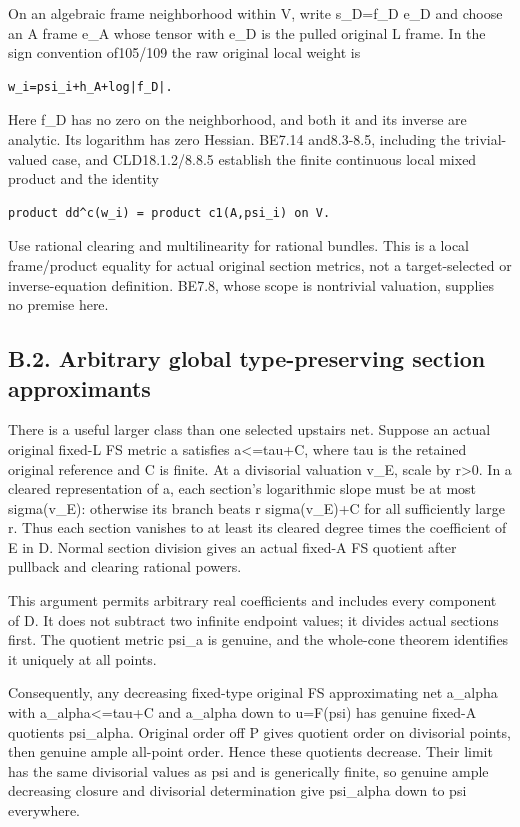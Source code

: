 \documentclass[
  10pt,
]{article}
\begin{document}
On an algebraic frame neighborhood within V, write s\_D=f\_D e\_D and
choose an A frame e\_A whose tensor with e\_D is the pulled original L
frame. In the sign convention of105/109 the raw original local weight is

\begin{verbatim}
w_i=psi_i+h_A+log|f_D|.
\end{verbatim}

Here f\_D has no zero on the neighborhood, and both it and its inverse
are analytic. Its logarithm has zero Hessian. BE7.14 and8.3-8.5,
including the trivial-valued case, and CLD18.1.2/8.8.5 establish the
finite continuous local mixed product and the identity

\begin{verbatim}
product dd^c(w_i) = product c1(A,psi_i) on V.
\end{verbatim}

Use rational clearing and multilinearity for rational bundles. This is a
local frame/product equality for actual original section metrics, not a
target-selected or inverse-equation definition. BE7.8, whose scope is
nontrivial valuation, supplies no premise here.

\subsection{B.2. Arbitrary global type-preserving section
approximants}\label{b.2.-arbitrary-global-type-preserving-section-approximants}

There is a useful larger class than one selected upstairs net. Suppose
an actual original fixed-L FS metric a satisfies a\textless=tau+C, where
tau is the retained original reference and C is finite. At a divisorial
valuation v\_E, scale by r\textgreater0. In a cleared representation of
a, each section's logarithmic slope must be at most sigma(v\_E):
otherwise its branch beats r sigma(v\_E)+C for all sufficiently large r.
Thus each section vanishes to at least its cleared degree times the
coefficient of E in D. Normal section division gives an actual fixed-A
FS quotient after pullback and clearing rational powers.

This argument permits arbitrary real coefficients and includes every
component of D. It does not subtract two infinite endpoint values; it
divides actual sections first. The quotient metric psi\_a is genuine,
and the whole-cone theorem identifies it uniquely at all points.

Consequently, any decreasing fixed-type original FS approximating net
a\_alpha with a\_alpha\textless=tau+C and a\_alpha down to u=F(psi) has
genuine fixed-A quotients psi\_alpha. Original order off P gives
quotient order on divisorial points, then genuine ample all-point order.
Hence these quotients decrease. Their limit has the same divisorial
values as psi and is generically finite, so genuine ample decreasing
closure and divisorial determination give psi\_alpha down to psi
everywhere.
\end{document}
